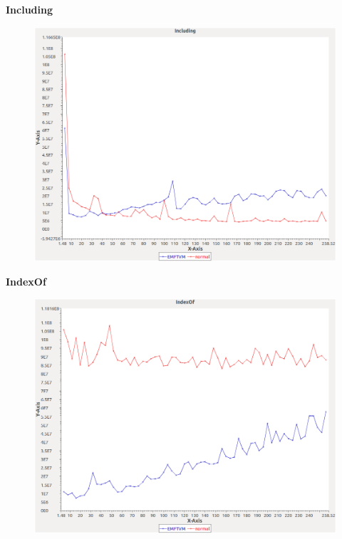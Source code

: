 \noindent\textbf{Including}

\begin{figure}[h]
\centering
\includegraphics[width=\textwidth]{graphs/sequence/Including}
\end{figure}
\pagebreak

\noindent\textbf{IndexOf}

\begin{figure}[h]
\centering
\includegraphics[width=\textwidth]{graphs/sequence/IndexOf}
\end{figure}
\pagebreak

